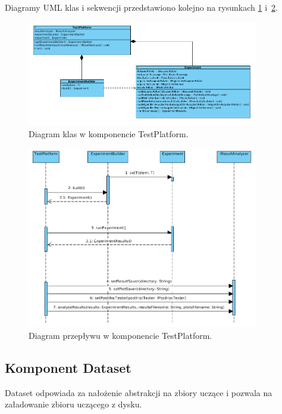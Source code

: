 \documentclass[12pt]{article}
\begin{document}
Diagramy UML klas i sekwencji przedstawiono kolejno na rysunkach \ref{fig:classTestPlatform} i~\ref{fig:sequenceTestPlatform}.

\newpage
\begin{figure}[!h]
\centering
	\includegraphics[width=0.9\textwidth]{img/class_diagrams/test_platform.png}
	\caption{Diagram klas w komponencie TestPlatform.}
	\label{fig:classTestPlatform}
\end{figure}

\begin{figure}[!h]
\centering
	\includegraphics[width=0.9\textwidth]{img/sequenceTestPlatform.png}
	\caption{Diagram przepływu w komponencie TestPlatform.}
	\label{fig:sequenceTestPlatform}
\end{figure}


\newpage

\subsection{Komponent Dataset}

Dataset odpowiada za nałożenie abstrakcji na zbiory uczące i pozwala na załadowanie zbioru uczącego z dysku. 
\end{document}
